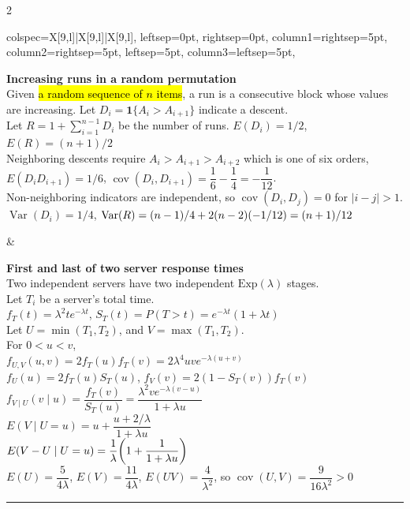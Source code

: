 \documentclass[12pt]{article}
\newcommand{\hlfancy}[2]{\sethlcolor{#1}\hl{#2}}
\DeclareMathOperator{\var}{Var}
\DeclareMathOperator{\cov}{cov}
\let\originalleft\left
\let\originalright\right
\renewcommand{\left}{\mathopen{}\mathclose\bgroup\originalleft}
\renewcommand{\right}{\aftergroup\egroup\originalright}
\begin{document}
\begin{paracol}{2}
\begin{tcolorbox}[title=Problems, width=\columnwidth]
\begin{tblr}{
				colspec={X[9,l]|X[9,l]|X[9,l]},
				leftsep=0pt,
				rightsep=0pt,
				column{1}={rightsep=5pt},
				column{2}={rightsep=5pt, leftsep=5pt},
				column{3}={leftsep=5pt},
			}
\begin{minipage}[t]{\linewidth}
				\textbf{Increasing runs in a random permutation} \\
				Given \hlfancy{lightgray}{a random sequence of $n$ items}, a run is a consecutive block whose values are increasing. Let $D_i=\mathbf{1}\{A_i>A_{i+1}\}$ indicate a descent. \\
				Let $R=1+\displaystyle\sum_{i=1}^{n-1}D_i$ be the number of runs. $E(D_i)=1/2$, $E(R)= (n+1)/2$ \\
				Neighboring descents require $A_i>A_{i+1}>A_{i+2}$ which is one of six orders, \\
				$E(D_iD_{i+1}) = 1/6$, $\cov(D_i,D_{i+1})=\dfrac16-\dfrac14=-\dfrac1{12}$. \\
				Non-neighboring indicators are independent,
				so $\cov(D_i,D_j) = 0$ for $|i-j|>1$. \\
				$\var(D_i) = 1/4$, $\var(R)=(n-1)/4 + 2(n-2)\left(-1/12\right) = (n+1)/12$
			\end{minipage}
			 &
			\begin{minipage}[t]{\linewidth}
				\textbf{First and last of two server response times} \\
				Two independent servers have two independent $\mathrm{Exp}(\lambda)$ stages. \\
				Let $T_i$ be a server's total time. \\
				$f_T(t)=\lambda^2te^{-\lambda t}$, $S_T(t)=P(T>t)=e^{-\lambda t}(1+\lambda t)$ \\
				Let $U=\min(T_1,T_2)$, and $V=\max(T_1,T_2)$. \\
				For $0<u<v$, \\
				$f_{U,V}(u,v)=2f_T(u)f_T(v)=2\lambda^4uv e^{-\lambda(u+v)}$ \\
				$f_U(u)=2f_T(u)S_T(u)$,  $f_V(v)=2(1 - S_T(v))f_T(v)$ \\
				$f_{V\mid U}(v\mid u)=\dfrac{f_T(v)}{S_T(u)}=\dfrac{\lambda^2v e^{-\lambda(v-u)}}{1+\lambda u}$ \\
				$E(V\mid U=u)=u+\dfrac{u+2/\lambda}{1+\lambda u}$ \\
				$E(V-U\mid U=u)=\dfrac1\lambda\left(1+\dfrac1{1+\lambda u}\right)$ \\
				$E(U)=\dfrac5{4\lambda}$, $E(V)=\dfrac{11}{4\lambda}$, $E(UV)=\dfrac4{\lambda^2}$,
				so $\cov(U,V)=\dfrac9{16\lambda^2}>0$

				\vspace*{4pt}\hrule\vspace*{4pt}


\end{minipage}
\end{tblr}
\end{tcolorbox}
\end{paracol}
\end{document}
